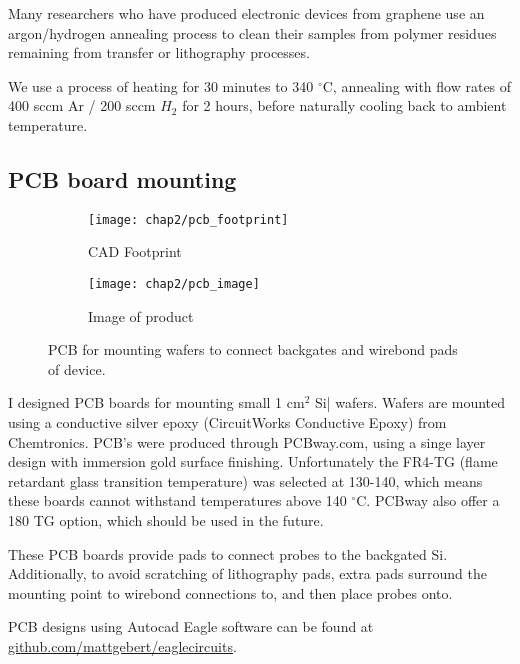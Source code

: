 \documentclass[../../Matt_Gebert_Honours_Thesis.tex]{subfiles}
\begin{document}
	Many researchers who have produced electronic devices from graphene use an argon/hydrogen annealing process to clean their samples from polymer residues remaining from transfer or lithography processes. \cite{lin_graphene_2012,cooper_experimental_2012,soldano_production_2010,chen_intrinsic_2008}
	
	We use a process of heating for 30 minutes to 340 $^\circ$C, annealing with flow rates of 400 sccm Ar / 200 sccm $H_2$ for 2 hours, before naturally cooling back to ambient temperature.

	\subsection{PCB board mounting}\label{sec:pcb}
	\begin{figure}[H]
		\centering
		\begin{subfigure}{0.45\textwidth}
			\centering
			\texttt{[image: chap2/pcb\_footprint]}
			\caption{CAD Footprint}
		\end{subfigure}
		\begin{subfigure}{0.45\textwidth}
			\centering
			\texttt{[image: chap2/pcb\_image]}
			\caption{Image of product}
		\end{subfigure}
		\caption[PCB wafter mount]{PCB for mounting wafers to connect backgates and wirebond pads of device.}
	\end{figure}
	I designed PCB boards for mounting small 1 cm$^2$ Si|\silicondioxide{} wafers. Wafers are mounted using a conductive silver epoxy (CircuitWorks Conductive Epoxy) from Chemtronics. PCB's were produced through PCBway.com, using a singe layer design with immersion gold surface finishing. Unfortunately the FR4-TG (flame retardant glass transition temperature) was selected at 130-140, which means these boards cannot withstand temperatures above 140 $^\circ$C. PCBway also offer a 180 TG option, which should be used in the future.
	
	These PCB boards provide pads to connect probes to the backgated Si. Additionally, to avoid scratching of lithography pads, extra pads surround the mounting point to wirebond connections to, and then place probes onto.
	
	PCB designs using Autocad Eagle software can be found at \href{https://www.github.com/mattgebert/eaglecircuits}{github.com/mattgebert/eaglecircuits}.
\end{document}
